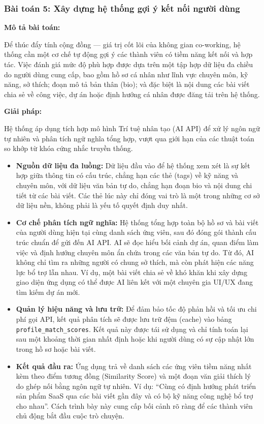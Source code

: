 \subsubsection{Bài toán 5: Xây dựng hệ thống gợi ý kết nối người dùng}

\textbf{Mô tả bài toán:}

Để thúc đẩy tính cộng đồng --- giá trị cốt lõi của không gian co-working, hệ thống cần một cơ chế tự động gợi ý các thành viên có tiềm năng kết nối và hợp tác. Việc đánh giá mức độ phù hợp được dựa trên một tập hợp dữ liệu đa chiều do người dùng cung cấp, bao gồm hồ sơ cá nhân như lĩnh vực chuyên môn, kỹ năng, sở thích; đoạn mô tả bản thân (bio); và đặc biệt là nội dung các bài viết chia sẻ về công việc, dự án hoặc định hướng cá nhân được đăng tải trên hệ thống.

\textbf{Giải pháp:}

Hệ thống áp dụng tích hợp mô hình Trí tuệ nhân tạo (AI API) để xử lý ngôn ngữ tự nhiên và phân tích ngữ nghĩa tổng hợp, vượt qua giới hạn của các thuật toán so khớp từ khóa cứng nhắc truyền thống.

\begin{itemize}
    \item \textbf{Nguồn dữ liệu đa luồng:} Dữ liệu đầu vào để hệ thống xem xét là sự kết hợp giữa thông tin có cấu trúc, chẳng hạn các thẻ (tags) về kỹ năng và chuyên môn, với dữ liệu văn bản tự do, chẳng hạn đoạn bio và nội dung chi tiết từ các bài viết. Các thẻ lúc này chỉ đóng vai trò là một trong những cơ sở dữ liệu nền, không phải là yếu tố quyết định duy nhất.
    \item \textbf{Cơ chế phân tích ngữ nghĩa:} Hệ thống tổng hợp toàn bộ hồ sơ và bài viết của người dùng hiện tại cùng danh sách ứng viên, sau đó đóng gói thành cấu trúc chuẩn để gửi đến AI API. AI sẽ đọc hiểu bối cảnh dự án, quan điểm làm việc và định hướng chuyên môn ẩn chứa trong các văn bản tự do. Từ đó, AI không chỉ tìm ra những người có chung sở thích, mà còn phát hiện các năng lực bổ trợ lẫn nhau. Ví dụ, một bài viết chia sẻ về khó khăn khi xây dựng giao diện ứng dụng có thể được AI liên kết với một chuyên gia UI/UX đang tìm kiếm dự án mới.
    \item \textbf{Quản lý hiệu năng và lưu trữ:} Để đảm bảo tốc độ phản hồi và tối ưu chi phí gọi API, kết quả phân tích sẽ được lưu trữ đệm (cache) vào bảng \texttt{profile\_match\_scores}. Kết quả này được tái sử dụng và chỉ tính toán lại sau một khoảng thời gian nhất định hoặc khi người dùng có sự cập nhật lớn trong hồ sơ hoặc bài viết.
    \item \textbf{Kết quả đầu ra:} Ứng dụng trả về danh sách các ứng viên tiềm năng nhất kèm theo điểm tương đồng (Similarity Score) và một đoạn văn giải thích lý do ghép nối bằng ngôn ngữ tự nhiên. Ví dụ: ``Cùng có định hướng phát triển sản phẩm SaaS qua các bài viết gần đây và có bộ kỹ năng công nghệ bổ trợ cho nhau''. Cách trình bày này cung cấp bối cảnh rõ ràng để các thành viên chủ động bắt đầu cuộc trò chuyện.
\end{itemize}